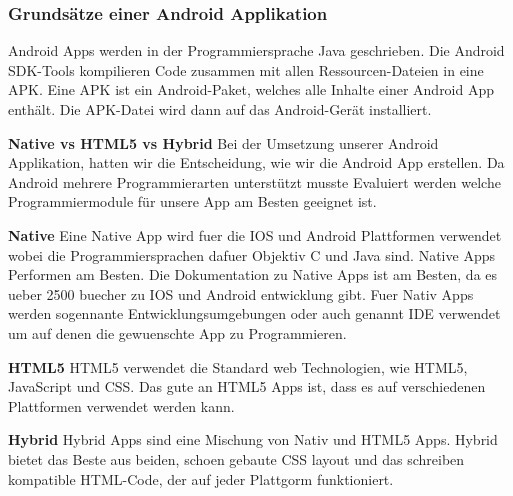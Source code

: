 \subsubsection{Grundsätze einer Android Applikation}
\label{subsec:aapp-fundam}

Android Apps werden in der Programmiersprache Java geschrieben.
Die Android SDK-Tools kompilieren Code zusammen mit allen Ressourcen-Dateien in eine APK.
Eine APK ist ein Android-Paket, welches alle Inhalte einer Android App enthält. 
Die APK-Datei wird dann auf das Android-Gerät installiert. 


\textbf{Native vs HTML5 vs Hybrid}
Bei der Umsetzung unserer Android Applikation, hatten wir die Entscheidung, wie wir die Android App erstellen. 
Da Android mehrere Programmierarten unterstützt musste Evaluiert werden welche Programmiermodule für unsere App am Besten geeignet ist. \nextline

\textbf{Native\newline} 
Eine Native App wird fuer die IOS und Android Plattformen verwendet wobei die Programmiersprachen dafuer Objektiv C und Java sind.
Native Apps Performen am Besten.
Die Dokumentation zu Native Apps ist am Besten, da es ueber 2500 buecher zu IOS und Android entwicklung gibt.
Fuer Nativ Apps werden sogennante Entwicklungsumgebungen oder auch genannt IDE verwendet um auf denen die gewuenschte App zu Programmieren.\nextline

\textbf{HTML5\newline} 
HTML5 verwendet die Standard web Technologien, wie HTML5, JavaScript und CSS. Das gute an HTML5 Apps ist, dass es auf verschiedenen Plattformen verwendet werden kann.\nextline

\textbf{Hybrid\newline} 
Hybrid Apps sind eine Mischung von Nativ und HTML5 Apps. Hybrid bietet das Beste aus beiden, schoen gebaute CSS layout und das schreiben kompatible HTML-Code, der auf jeder Plattgorm funktioniert.\nextline


\clearpage %